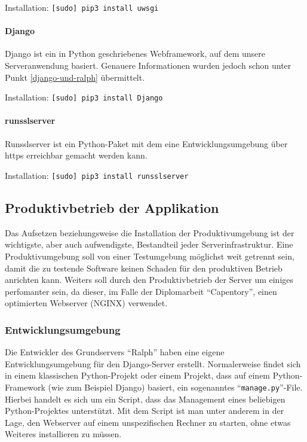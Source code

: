 Installation: \texttt{{[}sudo{]}\ pip3\ install\ uwsgi}

\hypertarget{django}{%
\paragraph{Django}\label{django}}

Django ist ein in Python geschriebenes Webframework, auf dem unsere
Serveranwendung basiert. Genauere Informationen wurden jedoch schon
unter Punkt \ref{django-und-ralph} übermittelt.

Installation: \texttt{{[}sudo{]}\ pip3\ install\ Django}

\hypertarget{runsslserver}{%
\paragraph{runsslserver}\label{runsslserver}}

Runsslserver ist ein Python-Paket mit dem eine Entwicklungsumgebung über
https erreichbar gemacht werden kann.

Installation: \texttt{{[}sudo{]}\ pip3\ install\ runsslserver}

\hypertarget{produktivbetrieb-der-applikation}{%
\subsection{Produktivbetrieb der
Applikation}\label{produktivbetrieb-der-applikation}}

Das Aufsetzen beziehungsweise die Installation der Produktivumgebung ist
der wichtigste, aber auch aufwendigste, Bestandteil jeder
Serverinfrastruktur. Eine Produktivumgebung soll von einer Testumgebung
möglichst weit getrennt sein, damit die zu testende Software keinen
Schaden für den produktiven Betrieb anrichten kann. Weiters soll durch
den Produktivbetrieb der Server um einiges perfomanter sein, da dieser,
im Falle der Diplomarbeit ``Capentory'', einen optimierten Webserver
(NGINX) verwendet.

\hypertarget{entwicklungsumgebung}{%
\subsubsection{Entwicklungsumgebung}\label{entwicklungsumgebung}}

Die Entwickler des Grundservers ``Ralph'' haben eine eigene
Entwicklungsumgebung für den Django-Server erstellt. Normalerweise
findet sich in einem klassischen Python-Projekt oder einem Projekt, dass
auf einem Python-Framework (wie zum Beispiel Django) basiert, ein
sogenanntes ``\texttt{manage.py}''-File. Hierbei handelt es sich um ein
Script, dass das Management eines beliebigen Python-Projektes
unterstützt. Mit dem Script ist man unter anderem in der Lage, den
Webserver auf einem unspezifischen Rechner zu starten, ohne etwas
Weiteres installieren zu müssen.


